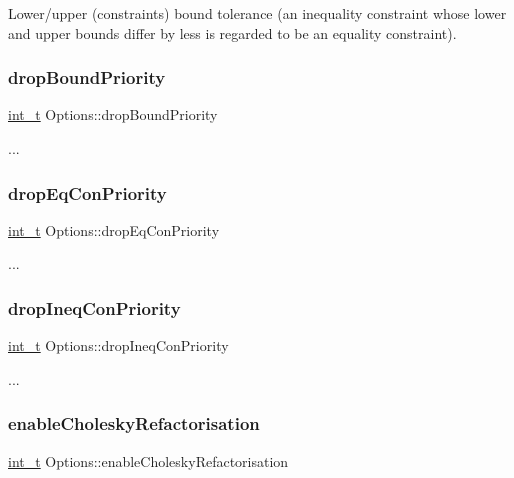 Lower/upper (constraints\textquotesingle{}) bound tolerance (an inequality constraint whose lower and upper bounds differ by less is regarded to be an equality constraint). \mbox{\label{class_options_a2298b2a19f20494aa1225316a9318e92}} 
\subsubsection{\texorpdfstring{drop\+Bound\+Priority}{dropBoundPriority}}
{\footnotesize\ttfamily \hyperlink{_types_8hpp_ab6fd6105e64ed14a0c9281326f05e623}{int\+\_\+t} Options\+::drop\+Bound\+Priority}

... \mbox{\label{class_options_a6720a59401830e78e8ff83830fe7f571}} 
\subsubsection{\texorpdfstring{drop\+Eq\+Con\+Priority}{dropEqConPriority}}
{\footnotesize\ttfamily \hyperlink{_types_8hpp_ab6fd6105e64ed14a0c9281326f05e623}{int\+\_\+t} Options\+::drop\+Eq\+Con\+Priority}

... \mbox{\label{class_options_a557c0f1d63e6f4c176ca0447bbf8c92d}} 
\subsubsection{\texorpdfstring{drop\+Ineq\+Con\+Priority}{dropIneqConPriority}}
{\footnotesize\ttfamily \hyperlink{_types_8hpp_ab6fd6105e64ed14a0c9281326f05e623}{int\+\_\+t} Options\+::drop\+Ineq\+Con\+Priority}

... \mbox{\label{class_options_a6618c6e219b55ce73a037b49176bc8cb}} 
\subsubsection{\texorpdfstring{enable\+Cholesky\+Refactorisation}{enableCholeskyRefactorisation}}
{\footnotesize\ttfamily \hyperlink{_types_8hpp_ab6fd6105e64ed14a0c9281326f05e623}{int\+\_\+t} Options\+::enable\+Cholesky\+Refactorisation}

